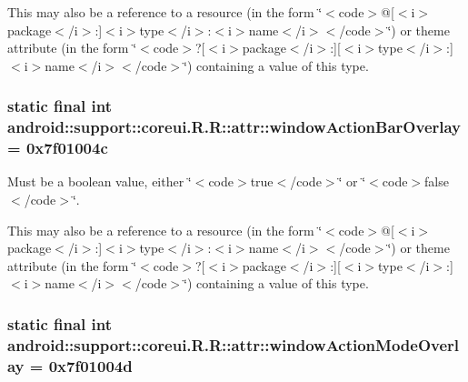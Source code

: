 This may also be a reference to a resource (in the form \char`\"{}$<$code$>$@\mbox{[}$<$i$>$package$<$/i$>$:\mbox{]}$<$i$>$type$<$/i$>$:$<$i$>$name$<$/i$>$$<$/code$>$\char`\"{}) or theme attribute (in the form \char`\"{}$<$code$>$?\mbox{[}$<$i$>$package$<$/i$>$:\mbox{]}\mbox{[}$<$i$>$type$<$/i$>$:\mbox{]}$<$i$>$name$<$/i$>$$<$/code$>$\char`\"{}) containing a value of this type. \hypertarget{classandroid_1_1support_1_1coreui_1_1_r_1_1attr_c1aa969225fa43a079be58a16c044c5e}{
\subsubsection[{windowActionBarOverlay}]{\setlength{\rightskip}{0pt plus 5cm}static final int android::support::coreui.R.R::attr::windowActionBarOverlay = 0x7f01004c}}
\label{classandroid_1_1support_1_1coreui_1_1_r_1_1attr_c1aa969225fa43a079be58a16c044c5e}


Must be a boolean value, either \char`\"{}$<$code$>$true$<$/code$>$\char`\"{} or \char`\"{}$<$code$>$false$<$/code$>$\char`\"{}. 

This may also be a reference to a resource (in the form \char`\"{}$<$code$>$@\mbox{[}$<$i$>$package$<$/i$>$:\mbox{]}$<$i$>$type$<$/i$>$:$<$i$>$name$<$/i$>$$<$/code$>$\char`\"{}) or theme attribute (in the form \char`\"{}$<$code$>$?\mbox{[}$<$i$>$package$<$/i$>$:\mbox{]}\mbox{[}$<$i$>$type$<$/i$>$:\mbox{]}$<$i$>$name$<$/i$>$$<$/code$>$\char`\"{}) containing a value of this type. \hypertarget{classandroid_1_1support_1_1coreui_1_1_r_1_1attr_4e1f5681f1ae0addbb5466e15abade1c}{
\subsubsection[{windowActionModeOverlay}]{\setlength{\rightskip}{0pt plus 5cm}static final int android::support::coreui.R.R::attr::windowActionModeOverlay = 0x7f01004d}}
\label{classandroid_1_1support_1_1coreui_1_1_r_1_1attr_4e1f5681f1ae0addbb5466e15abade1c}


